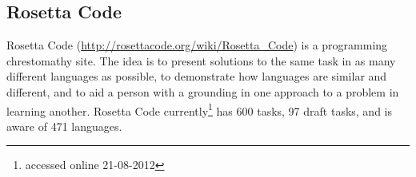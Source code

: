 % 
%
%

\begin{partbacktext}
\part{Rosetta Code}
\noindent Rosetta Code
(\href{http://rosettacode.org/wiki/Rosetta_Code}{http://rosettacode.org/wiki/Rosetta\_Code})
is a programming chrestomathy site. The idea is to present solutions
to the same task in as many different languages as possible, to
demonstrate how languages are similar and different, and to aid a
person with a grounding in one approach to a problem in learning
another. Rosetta Code currently\footnote{accessed online 21-08-2012}
has 600 tasks, 97 draft tasks, and is aware of 471 languages.
\end{partbacktext}